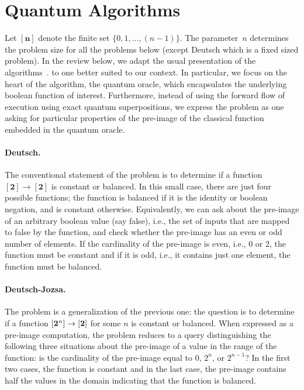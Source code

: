 \documentclass[sigplan,screen]{acmart}
\newcommand{\finset}[1]{[\mathbf{#1}]}
\theoremstyle{definition}
\begin{document}
\section{Quantum Algorithms}
\label{sec3}

Let $\finset{n}$ denote the finite set $\{ 0,1,\ldots,(n-1)\}$. The
parameter~$n$ determines the problem size for all the problems below
(except Deutsch which is a fixed sized problem). In the review below,
we adapt the usual presentation of the
algorithms~\cite{doi:10.1137/S0097539796300921,deutsch,deutschJozsa,365701,doi:10.1137/S0097539795293172,nielsen_chuang_2010,10.1145/237814.237866}.
to one better suited to our context. In particular, we focus on the
heart of the algorithm, the quantum oracle, which encapsulates the
underlying boolean function of interest. Furthermore, instead of using
the forward flow of execution using exact quantum superpositions, we
express the problem as one asking for particular properties of the
pre-image of the classical function embedded in the quantum oracle.

\paragraph*{Deutsch.}
The conventional statement of the problem is to determine if a
function $\finset{2} \rightarrow \finset{2}$ is constant or
balanced. In this small case, there are just four possible functions;
the function is balanced if it is the identity or boolean negation,
and is constant otherwise. Equivalently, we can ask about the
pre-image of an arbitrary boolean value (say false), i.e., the set of
inputs that are mapped to false by the function, and check whether the
pre-image has an even or odd number of elements. If the cardinality of
the pre-image is even, i.e., 0 or 2, the function must be constant and
if it is odd, i.e., it contains just one element, the function must be
balanced. 

\paragraph*{Deutsch-Jozsa.}
The problem is a generalization of the previous one: the question is
to determine if a function $\finset{2^{\it n}} \rightarrow \finset{2}$ for
some $n$ is constant or balanced. When expressed as a pre-image
computation, the problem reduces to a query distinguishing the
following three situations about the pre-image of a value in the range
of the function: is the cardinality of the pre-image equal to 0,
$2^n$, or $2^{n-1}$? In the first two cases, the function is constant
and in the last case, the pre-image contains half the values in the
domain indicating that the function is balanced. 
\end{document}
